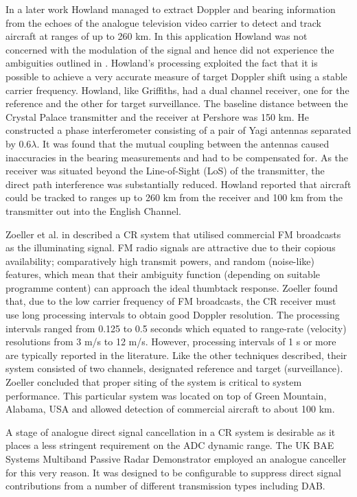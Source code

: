 In a later work \cite{howland1999} Howland managed to extract Doppler and bearing information from the echoes of the analogue television video carrier to detect and track aircraft at ranges of up to 260 km.  In this application Howland was not concerned with the modulation of the signal and hence did not experience the ambiguities outlined in \cite{griffiths1986}.  Howland's processing exploited the fact that it is possible to achieve a very accurate measure of target Doppler shift using a stable carrier frequency.  Howland, like Griffiths, had a dual channel receiver, one for the reference and the other for target surveillance.  The baseline distance between the Crystal Palace transmitter and the receiver at Pershore was 150 km.  He constructed a phase interferometer consisting of a pair of Yagi antennas separated by 0.6$\lambda$.  It was found that the mutual coupling between the antennas caused inaccuracies in the bearing measurements and had to be compensated for.  As the receiver was situated beyond the Line-of-Sight (LoS) of the transmitter, the direct path interference was substantially reduced.  Howland reported that aircraft could be tracked to ranges up to 260 km from the receiver and 100 km from the transmitter out into the English Channel.  

Zoeller et al. in \cite{zoeller} described a CR system that utilised commercial FM broadcasts as the illuminating signal.  FM radio signals are attractive due to their copious availability; comparatively high transmit powers, and random (noise-like) features, which mean that their ambiguity function (depending on suitable programme content) can approach the ideal thumbtack response.  Zoeller found that, due to the low carrier frequency of FM broadcasts, the CR receiver must use long processing intervals to obtain good Doppler resolution.  The processing intervals ranged from 0.125 to 0.5 seconds which equated to range-rate (velocity) resolutions from 3 m/s to 12 m/s. However, processing intervals of 1 s or more are typically reported in the literature.  Like the other techniques described, their system consisted of two channels, designated reference and target (surveillance).  Zoeller concluded that proper siting of the system is critical to system performance.  This particular system was located on top of Green Mountain, Alabama, USA and allowed detection of commercial aircraft to about 100 km.

A stage of analogue direct signal cancellation in a CR system is desirable as it places a less stringent requirement on the ADC dynamic range.  The UK BAE Systems Multiband Passive Radar Demonstrator \cite{pollard} employed an analogue canceller for this very reason.  It was designed to be configurable to suppress direct signal contributions from a number of different transmission types including DAB. 

